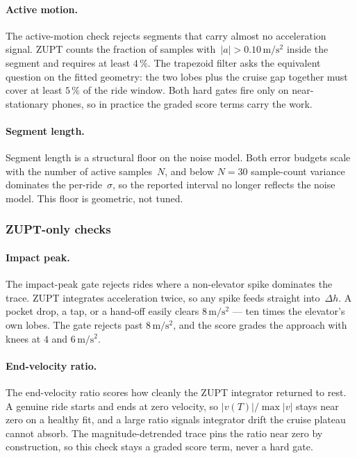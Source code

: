\documentclass[manuscript,review,screen]{acmart}
\begin{document}
\paragraph{Active motion.}
The active-motion check rejects segments that carry almost no
acceleration signal.  ZUPT counts the fraction of samples
with~$|a|>0.10\,\mathrm{m/s^{2}}$ inside the segment and requires at
least $4\,\%$.  The trapezoid filter asks the equivalent question on
the fitted geometry: the two lobes plus the cruise gap together must
cover at least $5\,\%$ of the ride window.  Both hard gates fire only
on near-stationary phones, so in practice the graded score terms
carry the work.

\paragraph{Segment length.}
Segment length is a structural floor on the noise model.  Both error
budgets scale with the number of active samples~$N$, and below
$N=30$ sample-count variance dominates the per-ride~$\sigma$, so the
reported interval no longer reflects the noise model.  This floor is
geometric, not tuned.

\subsubsection*{ZUPT-only checks}

\paragraph{Impact peak.}
The impact-peak gate rejects rides where a non-elevator spike
dominates the trace.  ZUPT integrates acceleration twice, so any
spike feeds straight into~$\Delta h$.  A pocket drop, a tap, or a
hand-off easily clears $8\,\mathrm{m/s^{2}}$ --- ten times the
elevator's own lobes.  The gate rejects past $8\,\mathrm{m/s^{2}}$,
and the score grades the approach with knees at $4$ and
$6\,\mathrm{m/s^{2}}$.

\paragraph{End-velocity ratio.}
The end-velocity ratio scores how cleanly the ZUPT integrator
returned to rest.  A genuine ride starts and ends at zero velocity,
so $|v(T)|/\max|v|$ stays near zero on a healthy fit, and a large
ratio signals integrator drift the cruise plateau cannot absorb.
The magnitude-detrended trace pins the ratio near zero by
construction, so this check stays a graded score term, never a hard
gate.
\end{document}
